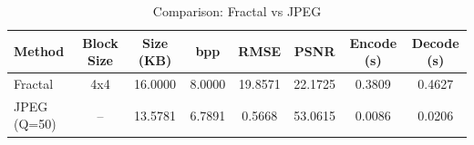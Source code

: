 \begin{table}[h]
\caption{Comparison: Fractal vs JPEG}
\label{tab:compression}
\begin{tabular}{lccccccc}
\toprule
Method & Block Size & Size (KB) & bpp & RMSE & PSNR & Encode (s) & Decode (s) \\
\midrule
Fractal & 4x4 & 16.0000 & 8.0000 & 19.8571 & 22.1725 & 0.3809 & 0.4627 \\
JPEG (Q=50) & -- & 13.5781 & 6.7891 & 0.5668 & 53.0615 & 0.0086 & 0.0206 \\
\bottomrule
\end{tabular}
\end{table}
